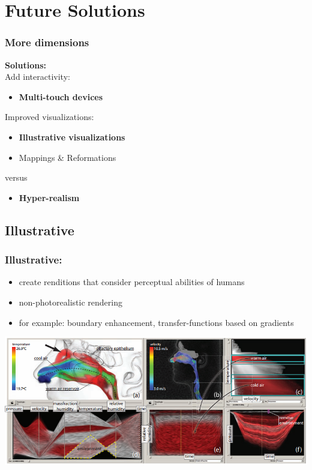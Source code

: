 \documentclass{beamer}
\begin{document}
\section{Future Solutions}
\begin{frame}
	\frametitle{More dimensions}
	\textbf{Solutions:}\\
	Add interactivity:
	\begin{itemize}
		\item \textbf{Multi-touch devices}
	\end{itemize}
	Improved visualizations:\\
	\begin{itemize}
		\item \textbf{Illustrative visualizations}
		\item Mappings \& Reformations
	\end{itemize}
	versus
	\begin{itemize}
		\item \textbf{Hyper-realism}
	\end{itemize}
\end{frame}

\subsection{Illustrative}
\begin{frame}
	\frametitle{Illustrative:} %
	\begin{itemize}
		\item create renditions that consider perceptual abilities of humans
		\item non-photorealistic rendering
		\item for example: boundary enhancement, transfer-functions based on
gradients
	\end{itemize}
	\includegraphics[width=\textwidth]{images/nose}
\end{frame}
\end{document}
